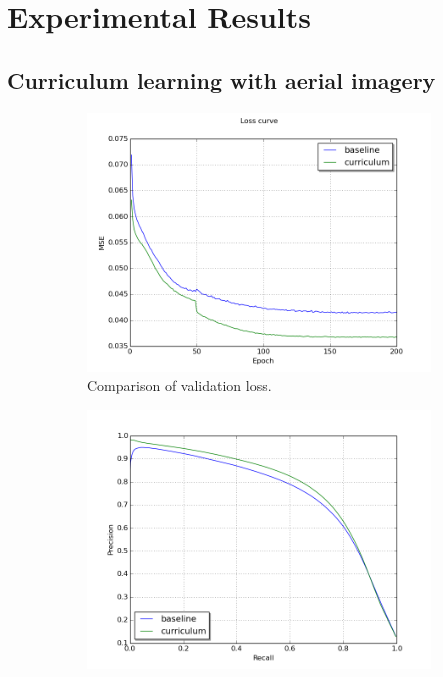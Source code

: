 \section{Experimental Results}
\label{sec:experimentalResults}

\subsection{Curriculum learning with aerial imagery}
\label{sec:results_curriculum_learning_aerial_imagery}
\begin{figure}[!ht]
\begin{subfigure}{0.48\textwidth}
\includegraphics[width=\linewidth]{figs/curr100/validation_loss_curve.png}
\caption{Comparison of validation loss.} \label{fig:curr100_loss}
\end{subfigure}
\hspace*{\fill} %
\begin{subfigure}{0.48\textwidth}
\includegraphics[width=\linewidth]{figs/curr100/validation_precision_recall.png}

\end{subfigure}
\end{figure}
